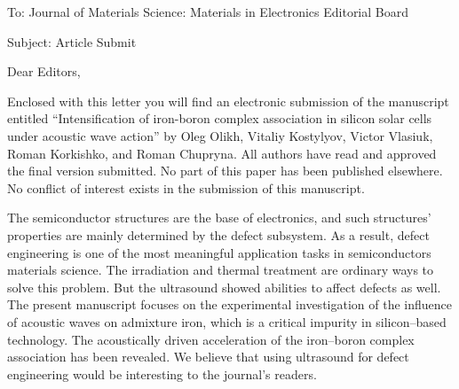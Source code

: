 \documentclass[preprint]{elsarticle}
\begin{document}
To:
Journal of Materials Science: Materials in Electronics  Editorial Board


Subject:
Article Submit

\vspace{5mm}
Dear Editors,

\vspace{3mm}
Enclosed with this letter you will find an electronic submission of the ma\-nu\-script entitled ``Intensification of iron-boron complex association in silicon solar cells under acoustic wave action'' by Oleg Olikh, Vitaliy Kostylyov,
Victor Vlasiuk, Roman Korkishko, and Roman Chupryna.
All authors have read and approved the final version submitted.
No part of this paper has been published elsewhere.
No conflict of interest exists in the submission of this manuscript.

The semiconductor structures are the base of electronics, and such structures' properties are mainly determined by the defect subsystem. 
As a result, defect engineering is one of the most meaningful application tasks in semiconductors materials science.
The irradiation and thermal treatment are ordinary ways to solve this problem.
But the ultrasound showed abilities to affect defects as well.
The present manuscript focuses on the experimental investigation of the influence of acoustic waves on admixture iron, which is a critical impurity in silicon--based technology.
The acoustically driven acceleration of the iron--boron complex association has been revealed.
We believe that using ultrasound for defect engineering would be interesting to the journal's readers.




\end{document}
